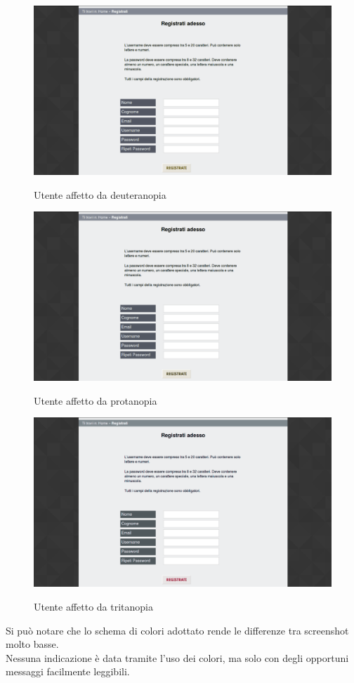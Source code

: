 	\begin{figure}
		\includegraphics[scale=0.3]{images/deuteranopia2.jpg}\\[1cm] \caption{Utente affetto da deuteranopia}
	\end{figure}
	\begin{figure}
		\includegraphics[scale=0.3]{images/protanopia2.jpg}\\[1cm] \caption{Utente affetto da protanopia} 
	\end{figure}
	\begin{figure}
		\includegraphics[scale=0.3]{images/tritanopia2.jpg}\\[1cm] \caption{Utente affetto da tritanopia} 
	\end{figure}
	\newpage
	Si può notare che lo schema di colori adottato rende le differenze tra screenshot molto basse.\\
	Nessuna indicazione è data tramite l'uso dei colori, ma solo con degli opportuni messaggi facilmente leggibili.
	
